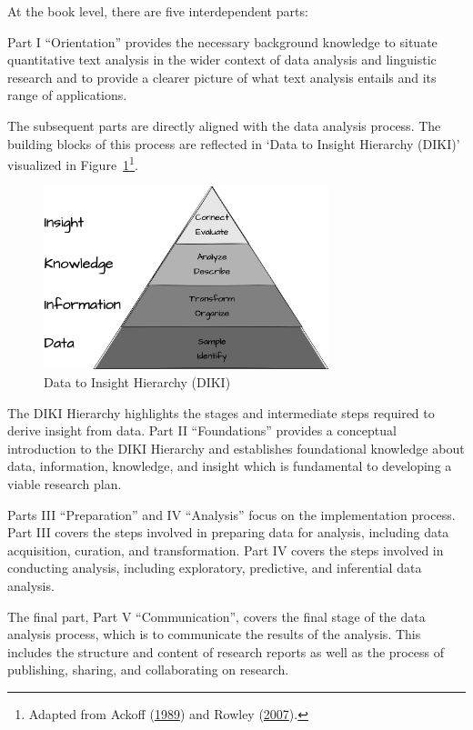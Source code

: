 \documentclass[
  letterpaper,
  DIV=11,
  numbers=noendperiod]{scrreport}
\theoremstyle{definition}
\theoremstyle{remark}
\begin{document}
At the book level, there are five interdependent parts:

Part I ``Orientation'' provides the necessary background knowledge to
situate quantitative text analysis in the wider context of data analysis
and linguistic research and to provide a clearer picture of what text
analysis entails and its range of applications.

The subsequent parts are directly aligned with the data analysis
process. The building blocks of this process are reflected in `Data to
Insight Hierarchy (DIKI)' visualized in
Figure~\ref{fig-diki-hierarchy}\footnote{Adapted from Ackoff
  (\protect\hyperlink{ref-Ackoff1989}{1989}) and Rowley
  (\protect\hyperlink{ref-Rowley2007}{2007}).}.

\begin{figure}[H]

{\centering \includegraphics[width=3.26in,height=\textheight]{figures/preface/p-diki.drawio.png}

}

\caption{\label{fig-diki-hierarchy}Data to Insight Hierarchy (DIKI)}

\end{figure}

The DIKI Hierarchy highlights the stages and intermediate steps required
to derive insight from data. Part II ``Foundations'' provides a
conceptual introduction to the DIKI Hierarchy and establishes
foundational knowledge about data, information, knowledge, and insight
which is fundamental to developing a viable research plan.

Parts III ``Preparation'' and IV ``Analysis'' focus on the
implementation process. Part III covers the steps involved in preparing
data for analysis, including data acquisition, curation, and
transformation. Part IV covers the steps involved in conducting
analysis, including exploratory, predictive, and inferential data
analysis.

The final part, Part V ``Communication'', covers the final stage of the
data analysis process, which is to communicate the results of the
analysis. This includes the structure and content of research reports as
well as the process of publishing, sharing, and collaborating on
research.
\end{document}
